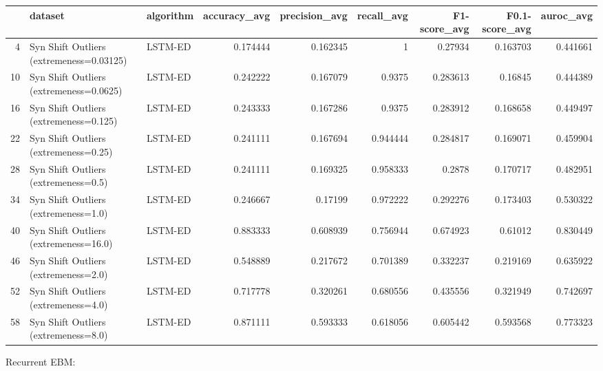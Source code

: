 \begin{tabular}{rllrrrrrr}
\hline
    & dataset                                  & algorithm   &   accuracy\_avg &   precision\_avg &   recall\_avg &   F1-score\_avg &   F0.1-score\_avg &   auroc\_avg \\
\hline
  4 & Syn Shift Outliers (extremeness=0.03125) & LSTM-ED     &       0.174444 &        0.162345 &     1        &       0.27934  &         0.163703 &    0.441661 \\
 10 & Syn Shift Outliers (extremeness=0.0625)  & LSTM-ED     &       0.242222 &        0.167079 &     0.9375   &       0.283613 &         0.16845  &    0.444389 \\
 16 & Syn Shift Outliers (extremeness=0.125)   & LSTM-ED     &       0.243333 &        0.167286 &     0.9375   &       0.283912 &         0.168658 &    0.449497 \\
 22 & Syn Shift Outliers (extremeness=0.25)    & LSTM-ED     &       0.241111 &        0.167694 &     0.944444 &       0.284817 &         0.169071 &    0.459904 \\
 28 & Syn Shift Outliers (extremeness=0.5)     & LSTM-ED     &       0.241111 &        0.169325 &     0.958333 &       0.2878   &         0.170717 &    0.482951 \\
 34 & Syn Shift Outliers (extremeness=1.0)     & LSTM-ED     &       0.246667 &        0.17199  &     0.972222 &       0.292276 &         0.173403 &    0.530322 \\
 40 & Syn Shift Outliers (extremeness=16.0)    & LSTM-ED     &       0.883333 &        0.608939 &     0.756944 &       0.674923 &         0.61012  &    0.830449 \\
 46 & Syn Shift Outliers (extremeness=2.0)     & LSTM-ED     &       0.548889 &        0.217672 &     0.701389 &       0.332237 &         0.219169 &    0.635922 \\
 52 & Syn Shift Outliers (extremeness=4.0)     & LSTM-ED     &       0.717778 &        0.320261 &     0.680556 &       0.435556 &         0.321949 &    0.742697 \\
 58 & Syn Shift Outliers (extremeness=8.0)     & LSTM-ED     &       0.871111 &        0.593333 &     0.618056 &       0.605442 &         0.593568 &    0.773323 \\
\hline
\end{tabular}

Recurrent EBM:

